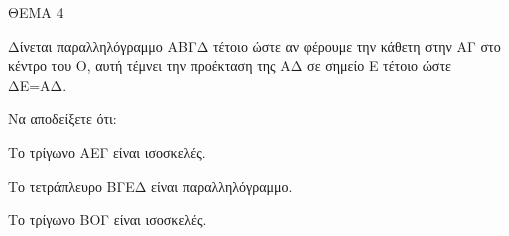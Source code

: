 
ΘΕΜΑ 4

Δίνεται παραλληλόγραμμο ΑΒΓΔ τέτοιο ώστε αν φέρουμε την κάθετη στην ΑΓ στο κέντρο του Ο, αυτή τέμνει την προέκταση της ΑΔ σε σημείο Ε τέτοιο ώστε ΔΕ=ΑΔ.

Να αποδείξετε ότι:

\begin{alist}
\item Το τρίγωνο ΑΕΓ είναι ισοσκελές. 

\item Το τετράπλευρο ΒΓΕΔ είναι παραλληλόγραμμο. 

\item Το τρίγωνο ΒΟΓ είναι ισοσκελές. 


\end{alist}
